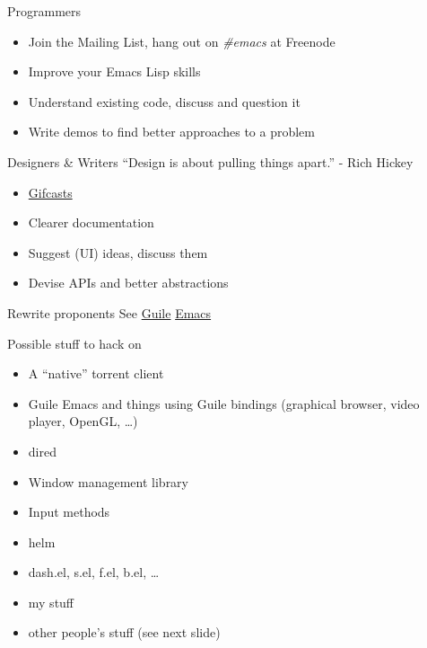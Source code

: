 \documentclass[presentation]{beamer}
\begin{document}
\begin{frame}[label=sec-7-1]{Programmers}
\begin{itemize}
\item Join the Mailing List, hang out on \emph{\#emacs} at Freenode
\item Improve your Emacs Lisp skills
\item Understand existing code, discuss and question it
\item Write demos to find better approaches to a problem
\end{itemize}
\end{frame}

\begin{frame}[label=sec-7-2]{Designers \& Writers}
“Design is about pulling things apart.” - Rich Hickey

\begin{itemize}
\item \href{https://github.com/chrisdone/structured-haskell-mode}{Gifcasts}
\item Clearer documentation
\item Suggest (UI) ideas, discuss them
\item Devise APIs and better abstractions
\end{itemize}
\end{frame}

\begin{frame}[label=sec-7-3]{Rewrite proponents}
See \href{http://www.emacswiki.org/emacs/GuileEmacs}{Guile} \href{http://git.hcoop.net/?p=bpt/emacs.git}{Emacs}
\end{frame}

\begin{frame}[label=sec-7-4]{Possible stuff to hack on}
\begin{itemize}
\item A “native” torrent client
\item Guile Emacs and things using Guile bindings (graphical browser,
video player, OpenGL, \ldots{})
\item dired
\item Window management library
\item Input methods
\item helm
\item dash.el, s.el, f.el, b.el, \ldots{}
\item my stuff
\item other people's stuff (see next slide)
\end{itemize}
\end{frame}
\end{document}
